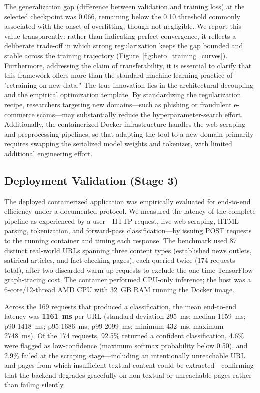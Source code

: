 \documentclass[informatics,article,submit,pdftex,moreauthors]{Definitions/mdpi}
\begin{document}
The generalization gap (difference between validation and training loss) at the selected checkpoint was 0.066, remaining below the 0.10 threshold commonly associated with the onset of overfitting, though not negligible. We report this value transparently: rather than indicating perfect convergence, it reflects a deliberate trade-off in which strong regularization keeps the gap bounded and stable across the training trajectory (Figure~\ref{fig:beto_training_curves}). Furthermore, addressing the claim of transferability, it is essential to clarify that this framework offers more than the standard machine learning practice of "retraining on new data." The true innovation lies in the architectural decoupling and the empirical optimization template. By standardizing the regularization recipe, researchers targeting new domains—such as phishing or fraudulent e-commerce scams—may substantially reduce the hyperparameter-search effort. Additionally, the containerized Docker infrastructure handles the web-scraping and preprocessing pipelines, so that adapting the tool to a new domain primarily requires swapping the serialized model weights and tokenizer, with limited additional engineering effort.

\subsection{Deployment Validation (Stage 3)}\label{sec:deployment-validation}
The deployed containerized application was empirically evaluated for end-to-end efficiency under a documented protocol. We measured the latency of the complete pipeline as experienced by a user—HTTP request, live web scraping, HTML parsing, tokenization, and forward-pass classification—by issuing POST requests to the running container and timing each response. The benchmark used 87 distinct real-world URLs spanning three content types (established news outlets, satirical articles, and fact-checking pages), each queried twice (174 requests total), after two discarded warm-up requests to exclude the one-time TensorFlow graph-tracing cost. The container performed CPU-only inference; the host was a 6-core/12-thread AMD CPU with 32~GB RAM running the Docker image.

Across the 169 requests that produced a classification, the mean end-to-end latency was \textbf{1161~ms} per URL (standard deviation 295~ms; median 1159~ms; p90 1418~ms; p95 1686~ms; p99 2099~ms; minimum 432~ms, maximum 2748~ms). Of the 174 requests, 92.5\% returned a confident classification, 4.6\% were flagged as low-confidence (maximum softmax probability below 0.50), and 2.9\% failed at the scraping stage—including an intentionally unreachable URL and pages from which insufficient textual content could be extracted—confirming that the backend degrades gracefully on non-textual or unreachable pages rather than failing silently.
\end{document}
